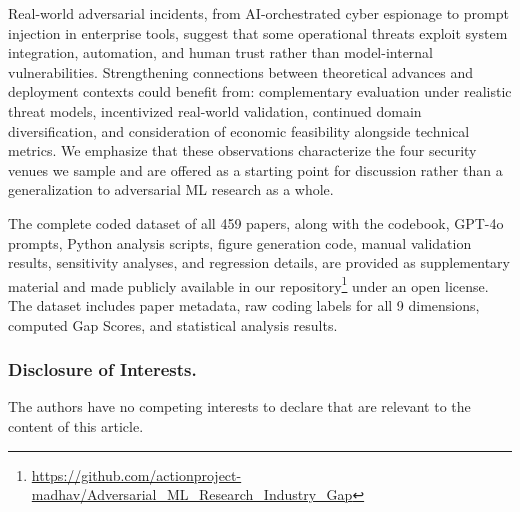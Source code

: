 \documentclass[runningheads]{llncs}
\begin{document}
Real-world adversarial incidents, from AI-orchestrated cyber espionage to prompt injection in enterprise tools, suggest that some operational threats exploit system integration, automation, and human trust rather than model-internal vulnerabilities. Strengthening connections between theoretical advances and deployment contexts could benefit from: complementary evaluation under realistic threat models, incentivized real-world validation, continued domain diversification, and consideration of economic feasibility alongside technical metrics. We emphasize that these observations characterize the four security venues we sample and are offered as a starting point for discussion rather than a generalization to adversarial ML research as a whole.

The complete coded dataset of all 459 papers, along with the codebook, GPT-4o prompts, Python analysis scripts, figure generation code, manual validation results, sensitivity analyses, and regression details, are provided as supplementary material and made publicly available in our repository\footnote{\url{https://github.com/actionproject-madhav/Adversarial_ML_Research_Industry_Gap}} under an open license. The dataset includes paper metadata, raw coding labels for all 9 dimensions, computed Gap Scores, and statistical analysis results.

\begin{credits}
\subsubsection{\discretionary{}{}{}Disclosure of Interests.} The authors have no competing interests to declare that are relevant to the content of this article.
\end{credits}



\end{document}
